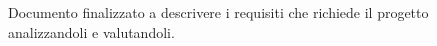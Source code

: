 Documento finalizzato a descrivere i requisiti che richiede il progetto analizzandoli e valutandoli.